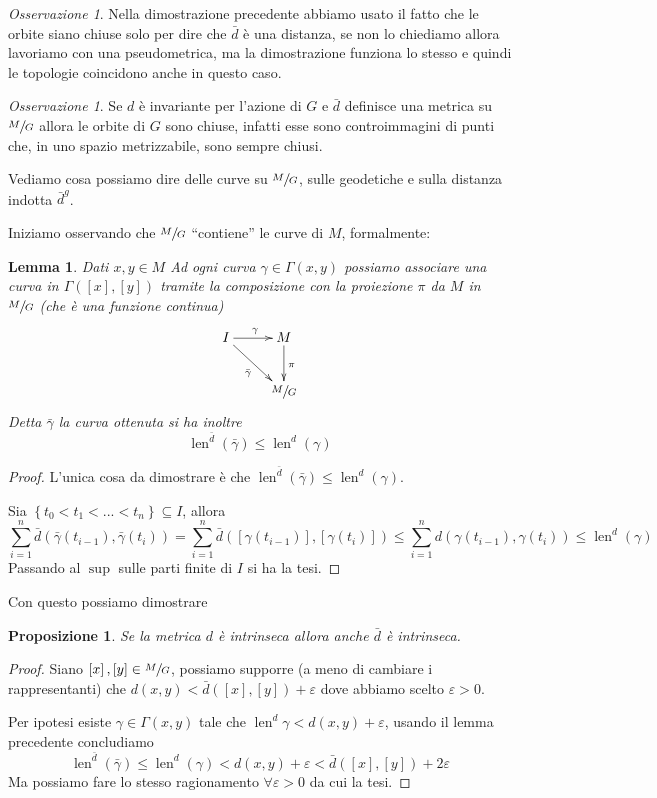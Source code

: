 \documentclass[a4paper,10pt]{article}
\newcounter{counter1}
\theoremstyle{plain}
\newtheorem{mylem}[counter1]{Lemma}
\newtheorem{mypro}[counter1]{Proposizione}
\theoremstyle{definition}
\theoremstyle{remark}
\newtheorem{myoss}[counter1]{Osservazione}
\newcommand{\set}[1]{\left\{#1\right\}}
\newcommand{\pa}[1]{\left(#1\right)}
\newcommand{\bra}[1]{\left[#1\right]}
\DeclareMathOperator{\len}{len}
\begin{document}
\begin{myoss}
  Nella dimostrazione precedente abbiamo usato il fatto che le orbite
  siano chiuse solo per dire che $\bar d$ è una distanza, se non lo
  chiediamo allora lavoriamo con una pseudometrica, ma la
  dimostrazione funziona lo stesso e quindi le topologie coincidono
  anche in questo caso.
\end{myoss}

\begin{myoss}
  Se $d$ è invariante per l'azione di $G$ e $\bar d$ definisce una
  metrica su $\sfrac{M}{G}$ allora le orbite di $G$ sono chiuse,
  infatti esse sono controimmagini di punti che, in uno spazio
  metrizzabile, sono sempre chiusi.
\end{myoss}

Vediamo cosa possiamo dire delle curve su $\sfrac{M}{G}$, sulle
geodetiche e sulla distanza indotta $\bar d ^g$.

Iniziamo osservando che $\sfrac{M}{G}$ ``contiene'' le curve di $M$,
formalmente:
\begin{mylem}
  Dati $x,y \in M$ Ad ogni curva $\gamma \in \Gamma(x,y)$ possiamo
  associare una curva in $\Gamma(\bra{x}, \bra{y})$ tramite la
  composizione con la proiezione $\pi$ da $M$ in $\sfrac{M}{G}$ (che è
  una funzione continua)
  \[ 
     \xymatrix{I \ar[r]^\gamma \ar[dr] _{\bar \gamma}& M \ar[d]^\pi \\
              & \sfrac{M}{G}  
            }
            \]
  Detta $\bar \gamma$ la curva ottenuta si ha inoltre
  \[ \len ^{\bar d} \pa{ \bar \gamma} \le \len ^d \pa{\gamma } \]
\end{mylem}
\begin{proof}
  L'unica cosa da dimostrare è che $\len ^{\bar d} \pa{ \bar \gamma}
  \le \len ^d \pa{\gamma }$.
  
  Sia $\set{ t_0 < t_1 < ... < t_n } \subseteq I$, allora
  \[ \sum _{i = 1} ^n \bar d ( \bar \gamma ( t_{i-1}) , \bar \gamma
  (t_i) ) = \sum _{i = 1} ^n \bar d ( \bra{\gamma ( t_{i-1}) } , \bra{
    \gamma (t_i)} ) \le \sum _{i = 1} ^n d ( \gamma ( t_{i-1}) ,
  \gamma (t_i) )  \le \len ^d (\gamma) \]
  Passando al $\sup$ sulle parti finite di $I$ si ha la tesi.
\end{proof}

Con questo possiamo dimostrare
\begin{mypro}
  Se la metrica $d$ è intrinseca allora anche $\bar d$ è intrinseca.
\end{mypro}
\begin{proof}
  Siano $\bra{x}, \bra{y} \in \sfrac{M}{G}$, possiamo supporre (a meno
  di cambiare i rappresentanti) che $d(x,y) < \bar d (\bra{x}, \bra{y}
  ) + \varepsilon$ dove abbiamo scelto $\varepsilon > 0$.

  Per ipotesi esiste $\gamma \in \Gamma( x,y)$ tale che $\len ^d
  \gamma < d(x,y) + \varepsilon$, usando il lemma precedente
  concludiamo
  \[ \len ^{\bar d} (\bar \gamma) \le \len ^d (\gamma) < d(x,y) +
  \varepsilon < \bar d (\bra{x}, \bra{y}) + 2\varepsilon \]
  Ma possiamo fare lo stesso ragionamento $\forall \varepsilon >0$ da
  cui la tesi.
\end{proof}
\end{document}
